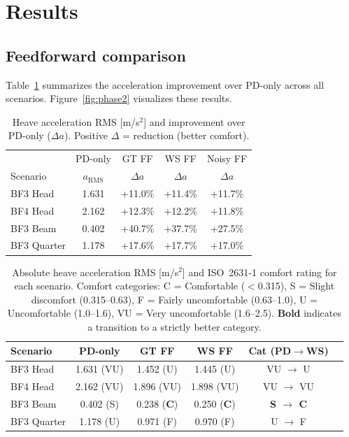 \documentclass[review]{elsarticle}
\begin{document}
\section{Results}
\label{sec:results}

\subsection{Feedforward comparison}

Table~\ref{tab:phase2} summarizes the acceleration improvement
over PD-only across all scenarios.
Figure~\ref{fig:phase2} visualizes these results.

\begin{table}[t]
\centering
\caption{Heave acceleration RMS [m/s$^2$] and improvement
over PD-only ($\Delta a$). Positive $\Delta$ = reduction (better comfort).}
\label{tab:phase2}
\begin{tabular}{lcccc}
\toprule
& PD-only & GT FF & WS FF & Noisy FF \\
Scenario & $a_\text{RMS}$ & $\Delta a$ & $\Delta a$ & $\Delta a$ \\
\midrule
BF3 Head    & 1.631 & +11.0\% & +11.4\% & +11.7\% \\
BF4 Head    & 2.162 & +12.3\% & +12.2\% & +11.8\% \\
BF3 Beam    & 0.402 & +40.7\% & +37.7\% & +27.5\% \\
BF3 Quarter & 1.178 & +17.6\% & +17.7\% & +17.0\% \\
\bottomrule
\end{tabular}
\end{table}

\begin{table}[t]
\centering
\caption{Absolute heave acceleration RMS [m/s$^2$] and ISO~2631-1
comfort rating for each scenario.  Comfort categories: C = Comfortable
($<$0.315), S = Slight discomfort (0.315--0.63),
F = Fairly uncomfortable (0.63--1.0), U = Uncomfortable (1.0--1.6),
VU = Very uncomfortable (1.6--2.5).
\textbf{Bold} indicates a transition to a strictly better category.}
\label{tab:comfort}
\begin{tabular}{lccccc}
\toprule
Scenario & PD-only & GT FF & WS FF & Cat (PD$\to$WS) \\
\midrule
BF3 Head    & 1.631 (VU) & 1.452 (U)  & 1.445 (U)  & VU $\to$ U \\
BF4 Head    & 2.162 (VU) & 1.896 (VU) & 1.898 (VU) & VU $\to$ VU \\
BF3 Beam    & 0.402 (S)  & 0.238 (\textbf{C}) & 0.250 (\textbf{C}) & \textbf{S $\to$ C} \\
BF3 Quarter & 1.178 (U)  & 0.971 (F)  & 0.970 (F)  & U $\to$ F \\
\bottomrule
\end{tabular}
\end{table}
\end{document}
